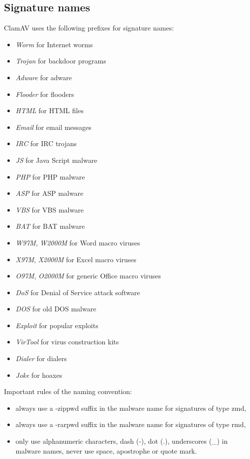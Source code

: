 \documentclass[a4paper,titlepage,12pt]{article}
\begin{document}
    \subsection{Signature names}
    ClamAV uses the following prefixes for signature names:
    \begin{itemize}
	\item \emph{Worm} for Internet worms
	\item \emph{Trojan} for backdoor programs
	\item \emph{Adware} for adware
	\item \emph{Flooder} for flooders
        \item \emph{HTML} for HTML files
        \item \emph{Email} for email messages
        \item \emph{IRC} for IRC trojans
	\item \emph{JS} for Java Script malware
	\item \emph{PHP} for PHP malware
	\item \emph{ASP} for ASP malware
	\item \emph{VBS} for VBS malware
	\item \emph{BAT} for BAT malware
	\item \emph{W97M}, \emph{W2000M} for Word macro viruses
	\item \emph{X97M}, \emph{X2000M} for Excel macro viruses
	\item \emph{O97M}, \emph{O2000M} for generic Office macro viruses
	\item \emph{DoS} for Denial of Service attack software
	\item \emph{DOS} for old DOS malware
	\item \emph{Exploit} for popular exploits
	\item \emph{VirTool} for virus construction kits
	\item \emph{Dialer} for dialers
	\item \emph{Joke} for hoaxes
    \end{itemize}
    Important rules of the naming convention:
    \begin{itemize}
	\item always use a -zippwd suffix in the malware name for signatures
	      of type zmd,
	\item always use a -rarpwd suffix in the malware name for signatures
	      of type rmd,
	\item only use alphanumeric characters, dash (-), dot (.), underscores
	      (\_) in malware names, never use space, apostrophe or quote mark.
    \end{itemize}
\end{document}
